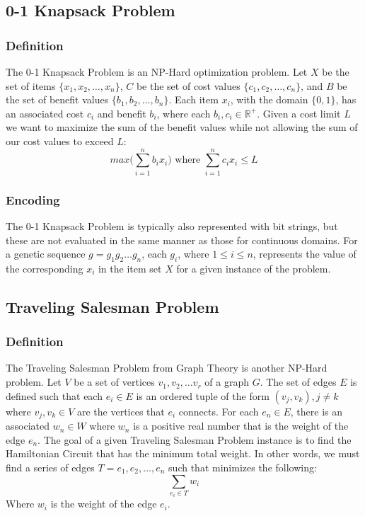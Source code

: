 %
%
\subsection*{0-1 Knapsack Problem}
\subsubsection*{Definition}

The 0-1 Knapsack Problem is an NP-Hard optimization problem. Let $X$ be the set of items $\{x_1, x_2, \ldots, x_n\}$, $C$ be the set of cost values $\{c_1, c_2, \ldots, c_n\}$, and $B$ be the set of benefit values $\{b_1, b_2, \ldots, b_n\}$. Each item $x_i$, with the domain $\{0,1\}$, has an associated cost $c_i$ and benefit $b_i$, where each $b_i,c_i \in \mathbb{R}^{+}$. Given a cost limit $L$ we want to maximize the sum of the benefit values while not allowing the sum of our cost values to exceed $L$:
\[ max\big( \sum\limits_{i = 1}^{n} b_ix_i \big) \text{ where } \sum\limits_{i = 1}^{n} c_ix_i \leq L \]

\subsubsection*{Encoding}
The  0-1 Knapsack Problem is typically also represented with bit strings, but these are not evaluated in the same manner as those for continuous domains. For a genetic sequence $g = g_1 g_2 \ldots g_n$, each $g_i$, where $1 \leq i \leq n$, represents the value of the corresponding $x_i$ in the item set $X$ for a given instance of the problem. 

%
%
\subsection*{Traveling Salesman Problem}
\subsubsection*{Definition}
The Traveling Salesman Problem from Graph Theory is another NP-Hard problem. Let $V$ be a set of vertices $v_1, v_2, \ldots v_r$ of a graph $G$. The set of edges $E$ is defined such that each $e_i \in E$ is an ordered tuple of the form $(v_j,v_k), j \not = k$ where $v_j,v_k \in V$ are the vertices that $e_i$ connects. For each $e_n \in E$, there is an associated $w_n \in W$ where $w_n$ is a positive real number that is the weight of the edge $e_n$. The goal of a given Traveling Salesman Problem instance is to find the Hamiltonian Circuit that has the minimum total weight. In other words, we must find a series of edges $T = e_{1},e_{2},\ldots,e_{n}$ such that minimizes the following\cite{Haxhimusa11}:
\[\sum\limits_{e_{i} \in T} w_{i}\]
\noindent Where $w_{i}$ is the weight of the edge $e_{i}$.

